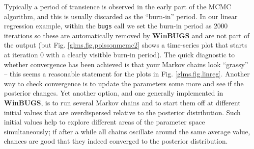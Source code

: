 Typically a period of transience is observed in the
early part of the MCMC algorithm, and this is usually discarded as the
``burn-in'' period. In our linear regression example, within the {\tt bugs} call we set the burn-in period as 2000 iterations so these are automatically removed by {\bf WinBUGS} and are not part of the output (but Fig. \ref{glms.fig.poissonmcmc2} shows a time-series plot that starts at iteration 0 with a clearly visitble burn-in period). The quick diagnostic to whether convergence has
been achieved is that your Markov chains look ``grassy'' -- this seems a reasonable statement for the plots in Fig. \ref{glms.fig.linreg}.  Another way to check convergence is to
update the parameters some more and see if the posterior changes. Yet
another option, and one generally implemented in {\bf WinBUGS}, is to
run several Markov chains and to start them off at different initial
values that are overdispersed relative to the posterior
distribution. Such initial values help to explore different areas of
the parameter space simultaneously; if after a while all chains
oscillate around the same average value, chances are good that they
indeed converged to the posterior distribution.

